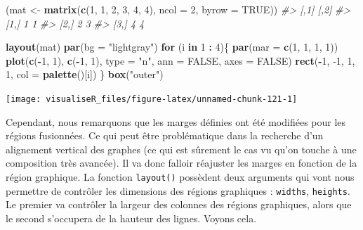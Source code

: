 \documentclass[]{article}
\newenvironment{Shaded}{\begin{snugshade}}{\end{snugshade}}
\newcommand{\CommentTok}[1]{\textcolor[rgb]{0.56,0.35,0.01}{\textit{#1}}}
\newcommand{\ControlFlowTok}[1]{\textcolor[rgb]{0.13,0.29,0.53}{\textbf{#1}}}
\newcommand{\DataTypeTok}[1]{\textcolor[rgb]{0.13,0.29,0.53}{#1}}
\newcommand{\DecValTok}[1]{\textcolor[rgb]{0.00,0.00,0.81}{#1}}
\newcommand{\KeywordTok}[1]{\textcolor[rgb]{0.13,0.29,0.53}{\textbf{#1}}}
\newcommand{\NormalTok}[1]{#1}
\newcommand{\OperatorTok}[1]{\textcolor[rgb]{0.81,0.36,0.00}{\textbf{#1}}}
\newcommand{\OtherTok}[1]{\textcolor[rgb]{0.56,0.35,0.01}{#1}}
\newcommand{\StringTok}[1]{\textcolor[rgb]{0.31,0.60,0.02}{#1}}
\begin{document}
\begin{Shaded}
\begin{Highlighting}[]
\NormalTok{(mat <-}\StringTok{ }\KeywordTok{matrix}\NormalTok{(}\KeywordTok{c}\NormalTok{(}\DecValTok{1}\NormalTok{, }\DecValTok{1}\NormalTok{, }\DecValTok{2}\NormalTok{, }\DecValTok{3}\NormalTok{, }\DecValTok{4}\NormalTok{, }\DecValTok{4}\NormalTok{), }\DataTypeTok{ncol =} \DecValTok{2}\NormalTok{, }\DataTypeTok{byrow =} \OtherTok{TRUE}\NormalTok{))}
\CommentTok{#>      [,1] [,2]}
\CommentTok{#> [1,]    1    1}
\CommentTok{#> [2,]    2    3}
\CommentTok{#> [3,]    4    4}
\end{Highlighting}
\end{Shaded}

\begin{Shaded}
\begin{Highlighting}[]
\KeywordTok{layout}\NormalTok{(mat)}
\KeywordTok{par}\NormalTok{(}\DataTypeTok{bg =} \StringTok{"lightgray"}\NormalTok{)}
\ControlFlowTok{for}\NormalTok{ (i }\ControlFlowTok{in} \DecValTok{1} \OperatorTok{:}\StringTok{ }\DecValTok{4}\NormalTok{)\{}
\KeywordTok{par}\NormalTok{(}\DataTypeTok{mar =} \KeywordTok{c}\NormalTok{(}\DecValTok{1}\NormalTok{, }\DecValTok{1}\NormalTok{, }\DecValTok{1}\NormalTok{, }\DecValTok{1}\NormalTok{))}
\KeywordTok{plot}\NormalTok{(}\KeywordTok{c}\NormalTok{(}\OperatorTok{-}\DecValTok{1}\NormalTok{, }\DecValTok{1}\NormalTok{), }\KeywordTok{c}\NormalTok{(}\OperatorTok{-}\DecValTok{1}\NormalTok{, }\DecValTok{1}\NormalTok{), }\DataTypeTok{type =} \StringTok{"n"}\NormalTok{, }\DataTypeTok{ann =} \OtherTok{FALSE}\NormalTok{, }\DataTypeTok{axes =} \OtherTok{FALSE}\NormalTok{)}
\KeywordTok{rect}\NormalTok{(}\OperatorTok{-}\DecValTok{1}\NormalTok{, }\DecValTok{-1}\NormalTok{, }\DecValTok{1}\NormalTok{, }\DecValTok{1}\NormalTok{, }\DataTypeTok{col =} \KeywordTok{palette}\NormalTok{()[i])}
\NormalTok{\}}
\KeywordTok{box}\NormalTok{(}\StringTok{"outer"}\NormalTok{)}
\end{Highlighting}
\end{Shaded}

\begin{center}\texttt{[image: visualiseR\_files/figure-latex/unnamed-chunk-121-1]} \end{center}

Cependant, nous remarquons que les marges définies ont été modifiées pour les
régions fusionnées. Ce qui peut être problématique dans la recherche d'un
alignement vertical des graphes (ce qui est sûrement le cas vu qu'on touche à
une composition très avancée). Il va donc falloir réajuster les marges en
fonction de la région graphique. La fonction \texttt{layout()} possèdent deux arguments
qui vont nous permettre de contrôler les dimensions des régions graphiques :
\texttt{widths}, \texttt{heights}. Le premier va contrôler la largeur des colonnes des régions
graphiques, alors que le second s'occupera de la hauteur des lignes. Voyons
cela.
\end{document}
